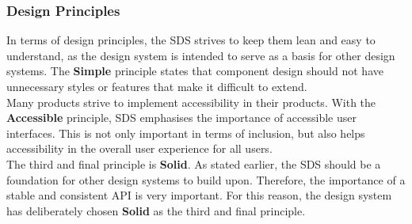 \subsubsection*{Design Principles}
In terms of design principles, the SDS strives to keep them lean and easy to understand, as the design system is intended to serve as a basis for other design systems. The \textbf{Simple} principle states that component design should not have unnecessary styles or features that make it difficult to extend. \\
Many products strive to implement accessibility in their products. With the \textbf{Accessible} principle, SDS emphasises the importance of accessible user interfaces. This is not only important in terms of inclusion, but also helps accessibility in the overall user experience for all users. \\
The third and final principle is \textbf{Solid}. As stated earlier, the SDS should be a foundation for other design systems to build upon. Therefore, the importance of a stable and consistent API is very important. For this reason, the design system has deliberately chosen \textbf{Solid} as the third and final principle. \\
